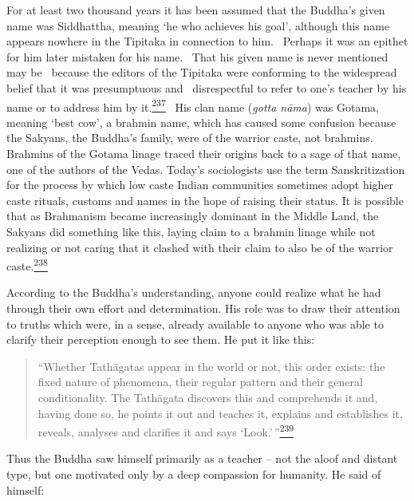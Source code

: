 For at least two thousand years it has been assumed that the Buddha's
given name was Siddhattha, meaning `he who achieves his goal', although
this name appears nowhere in the Tipitaka in connection to him.~ Perhaps
it was an epithet for him later mistaken for his name. ~That his given
name is never mentioned may be~ because the editors of the Tipitaka were
conforming to the widespread belief that it was presumptuous and
~disrespectful to refer to one's teacher by his name or to address him
by
it.\label{footprints_split_010.html_fnref237}\hyperref[footprints_split_024.htmlux5cux23fn237]{\textsuperscript{237}}~
His clan name (\emph{gotta nāma}) was Gotama, meaning `best cow', a
brahmin name, which has caused some confusion because the Sakyans, the
Buddha's family, were of the warrior caste, not brahmins. Brahmins of
the Gotama linage traced their origins back to a sage of that name, one
of the authors of the Vedas. Today's sociologists use the term
Sanskritization for the process by which low caste Indian communities
sometimes adopt higher caste rituals, customs and names in the hope of
raising their status. It is possible that as Brahmanism became
increasingly dominant in the Middle Land, the Sakyans did something like
this, laying claim to a brahmin linage while not realizing or not caring
that it clashed with their claim to also be of the warrior
caste.\label{footprints_split_010.html_fnref238}\hyperref[footprints_split_024.htmlux5cux23fn238]{\textsuperscript{238}}

According to the Buddha's understanding, anyone could realize what he
had through their own effort and determination. His role was to draw
their attention to truths which were, in a sense, already available to
anyone who was able to clarify their perception enough to see them. He
put it like this:

\begin{quote}
``Whether Tathāgatas appear in the world or not, this order exists: the
fixed nature of phenomena, their regular pattern and their general
conditionality. The Tathāgata discovers this and comprehends it and,
having done so, he points it out and teaches it, explains and
establishes it, reveals, analyses and clarifies it and says
`Look.'\,''\label{footprints_split_010.html_fnref239}\hyperref[footprints_split_024.htmlux5cux23fn239]{\textsuperscript{239}}
\end{quote}

Thus the Buddha saw himself primarily as a teacher -- not the aloof and
distant type, but one motivated only by a deep compassion for humanity.
He said of himself:

